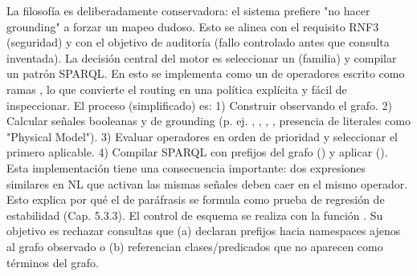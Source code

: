 \markdownRendererUlEndTight \markdownRendererInterblockSeparator
{}La filosofía es deliberadamente conservadora: el sistema prefiere "no hacer grounding" a forzar un mapeo dudoso. Esto se alinea con el requisito RNF3 (seguridad) y con el objetivo de auditoría (fallo controlado antes que consulta inventada).\markdownRendererInterblockSeparator
{}\markdownRendererInterblockSeparator
{}La decisión central del motor es seleccionar un  (familia) y compilar un patrón SPARQL. En  esto se implementa como un  de operadores escrito como ramas  , lo que convierte el routing en una política explícita y fácil de inspeccionar.\markdownRendererInterblockSeparator
{}El proceso (simplificado) es:\markdownRendererInterblockSeparator
{}1) Construir  observando el grafo. 2) Calcular señales booleanas y  de grounding (p. ej. , , , , presencia de literales como "Physical Model"). 3) Evaluar operadores en orden de prioridad y seleccionar el primero aplicable. 4) Compilar SPARQL con prefijos del grafo () y aplicar  ().\markdownRendererInterblockSeparator
{}Esta implementación tiene una consecuencia importante: dos expresiones similares en NL que activan las mismas señales deben caer en el mismo operador. Esto explica por qué el  de paráfrasis se formula como prueba de regresión de estabilidad (Cap. 5.3.3).\markdownRendererInterblockSeparator
{}\markdownRendererInterblockSeparator
{}El control de esquema se realiza con la función . Su objetivo es rechazar consultas que (a) declaran prefijos hacia namespaces ajenos al grafo observado o (b) referencian clases/predicados que no aparecen como términos del grafo.\markdownRendererInterblockSeparator
